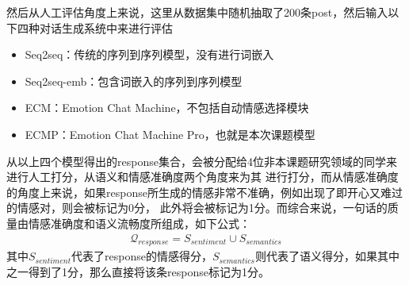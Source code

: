 \documentclass[supercite]{HustGraduPaper}
\theoremstyle{definition}
\begin{document}
然后从人工评估角度上来说，这里从数据集中随机抽取了200条post，然后输入以下四种对话生成系统中来进行评估
\begin{itemize}
  \item Seq2seq：传统的序列到序列模型，没有进行词嵌入
  \item Seq2seq-emb：包含词嵌入的序列到序列模型
  \item ECM：Emotion Chat Machine，不包括自动情感选择模块
  \item ECMP：Emotion Chat Machine Pro，也就是本次课题模型
\end{itemize}
从以上四个模型得出的response集合，会被分配给4位非本课题研究领域的同学来进行人工打分，从语义和情感准确度两个角度来为其
进行打分，而从情感准确度的角度上来说，如果response所生成的情感非常不准确，例如出现了即开心又难过的情感对，则会被标记为0分，
此外将会被标记为1分。而综合来说，一句话的质量由情感准确度和语义流畅度所组成，如下公式：
\begin{align}
  \mathcal{Q}_{response} = S_{sentiment} \cup S_{semantics} \label{5.1}
\end{align}
其中$S_{sentiment}$代表了response的情感得分，$S_{semantics}$则代表了语义得分，如果其中之一得到了1分，那么直接将该条response标记为1分。
\end{document}
